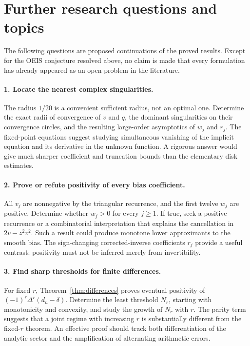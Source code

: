\documentclass[11pt]{article}
\numberwithin{equation}{section}
\theoremstyle{definition}
\theoremstyle{remark}
\begin{document}
\section{Further research questions and topics}\label{sec:research}
The following questions are proposed continuations of the proved
results. Except for the OEIS conjecture resolved above, no claim is
made that every formulation has already appeared as an open problem
in the literature.

\paragraph{1. Locate the nearest complex singularities.}
The radius $1/20$ is a convenient sufficient radius, not an optimal one.
Determine the exact radii of convergence of $v$ and $q$, the dominant
singularities on their convergence circles, and the resulting large-order
asymptotics of $w_j$ and $r_j$. The fixed-point equations suggest studying
simultaneous vanishing of the implicit equation and its derivative in
the unknown function. A rigorous answer would give much sharper
coefficient and truncation bounds than the elementary disk estimates.

\paragraph{2. Prove or refute positivity of every bias coefficient.}
All $v_j$ are nonnegative by the triangular recurrence, and the first
twelve $w_j$ are positive. Determine whether $w_j>0$ for every $j\ge1$.
If true, seek a positive recurrence or a combinatorial interpretation
that explains the cancellation in $2v-z^2v^2$. Such a result could
produce monotone lower approximants to the smooth bias.
The sign-changing corrected-inverse coefficients $r_j$ provide a useful
contrast: positivity must not be inferred merely from invertibility.

\paragraph{3. Find sharp thresholds for finite differences.}
For fixed $r$, Theorem~\ref{thm:differences} proves eventual positivity
of $(-1)^r\Delta^r(d_n-\delta)$. Determine the least threshold $N_r$,
starting with monotonicity and convexity, and study the growth of $N_r$
with $r$. The parity term suggests that a joint regime with increasing
$r$ is substantially different from the fixed-$r$ theorem. An effective
proof should track both differentiation of the analytic sector and the
amplification of alternating arithmetic errors.
\end{document}
